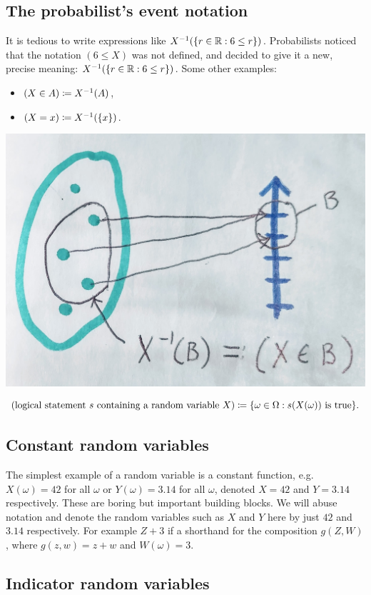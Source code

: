 \documentclass{article}
\begin{document}
\subsection{The probabilist's event notation}\label{sec:probabilist}

It is tedious to write expressions like $X^{-1}(\{r \in {\mathbb R} : 6 \le r\})$. Probabilists noticed that the notation $(6 \le X)$ was not defined, and decided to give it a new, precise meaning: $X^{-1}(\{r \in {\mathbb R} : 6 \le r\})$. Some other examples:
\begin{itemize}
  \item $(X \in A) \coloneqq X^{-1}(A)$,
  \item $(X = x) \coloneqq X^{-1}(\{x\})$.
\end{itemize}
\begin{center}
	\includegraphics[width=0.5\linewidth]{figures/inverse}
\end{center}

 \[(\text{logical statement }s\text{ containing a random variable }X) \coloneqq \{\omega \in \Omega : s(X(\omega))\text{ is true}\}. \]


\subsection{Constant random variables}

The simplest example of a random variable is a constant function, e.g. $X(\omega) = 42$ for all $\omega$ or $Y(\omega) = 3.14$ for all $\omega$, denoted $X = 42$ and $Y = 3.14$ respectively. These are boring but important building blocks. We will abuse notation and denote the random variables such as $X$ and $Y$ here by just $42$ and $3.14$ respectively. For example $Z + 3$ if a shorthand for the composition $g(Z, W)$, where $g(z, w) = z + w$ and $W(\omega) = 3$.

\subsection{Indicator random variables}\label{sec:indicator}
\end{document}
